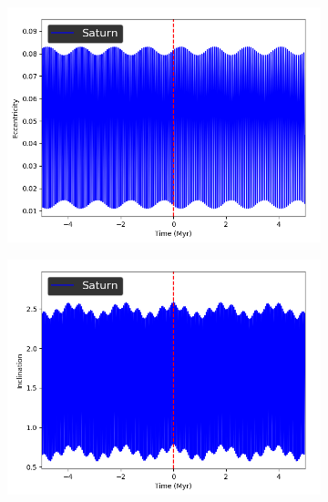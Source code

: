 \documentclass[11pt, oneside]{article}   	%
\begin{document}
\begin{figure}[!h]
	\ContinuedFloat
    \centering
    \begin{subfigure}[t]{0.49\textwidth}
    \captionsetup{width=0.9\textwidth}
	\centering
       	 \includegraphics[width=\textwidth]{Eccentricity_Saturn}
    \end{subfigure}
    \begin{subfigure}[t]{0.49\textwidth}
    \captionsetup{width=0.9\textwidth}
        	\centering
	\includegraphics[width=\textwidth]{Inclination_Saturn}
    \end{subfigure}
\end{figure}
\end{document}
